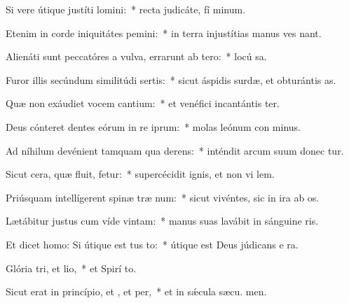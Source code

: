 \item Si vere útique justíti lomini:~* recta judicáte, fí minum.
\item Etenim in corde iniquitátes pemini:~* in terra injustítias manus ves nant.
\item Alienáti sunt peccatóres a vulva, errarunt ab tero:~* locú  sa.
\item Furor illis secúndum similitúdi sertis:~* sicut áspidis surdæ, et obturántis  as.
\item Quæ non exáudiet vocem cantium:~* et venéfici incantántis ter.
\item Deus cónteret dentes eórum in re iprum:~* molas leónum con minus.
\item Ad níhilum devénient tamquam qua derens:~* inténdit arcum suum donec tur.
\item Sicut cera, quæ fluit, fetur:~* supercécidit ignis, et non vi lem.
\item Priúsquam intellígerent spinæ træ num:~* sicut vivéntes, sic in ira ab os.
\item Lætábitur justus cum víde vintam:~* manus suas lavábit in sánguine ris.
\item Et dicet homo: Si útique est tus to:~* útique est Deus júdicans e  ra.
\item Glória tri, et lio,~* et Spirí to.
\item Sicut erat in princípio, et , et per,~* et in sǽcula sæcu. men.
